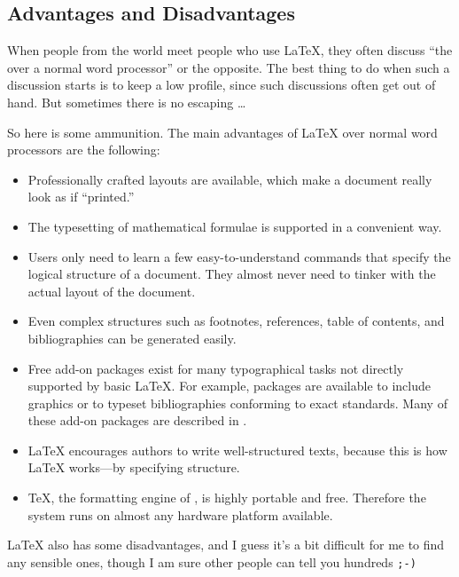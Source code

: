 \subsection{Advantages and Disadvantages}

When people from the  world meet people who use \LaTeX{},
they often discuss ``the  over a normal
word processor'' or the opposite.  The best thing to do when such
a discussion starts is to keep a low profile, since such discussions
often get out of hand. But sometimes there is no escaping \ldots

\medskip\noindent So here is some ammunition. The main advantages
of \LaTeX{} over normal word processors are the following:

\begin{itemize}

\item Professionally crafted layouts are available, which make a
  document really look as if ``printed.''
\item The typesetting of mathematical formulae is supported in a
  convenient way.
\item Users only need to learn a few easy-to-understand commands
  that specify the logical structure of a document. They almost never
  need to tinker with the actual layout of the document.
\item Even complex structures such as footnotes, references, table of
  contents, and bibliographies can be generated easily.
\item Free add-on packages exist for many typographical tasks not directly supported by basic
  \LaTeX. For example, packages are
  available to include \PSi{} graphics or to typeset
  bibliographies conforming to exact standards. Many of these add-on
  packages are described in \companion.
\item \LaTeX{} encourages authors to write well-structured texts,
  because this is how \LaTeX{} works---by specifying structure.
\item \TeX, the formatting engine of \LaTeXe, is highly portable and free.
  Therefore the system runs on almost any hardware platform
  available. 

%
%
\end{itemize}

\medskip

\noindent\LaTeX{} also has some disadvantages, and I guess it's a bit
difficult for me to find any sensible ones, though I am sure other people
can tell you hundreds \texttt{;-)}

